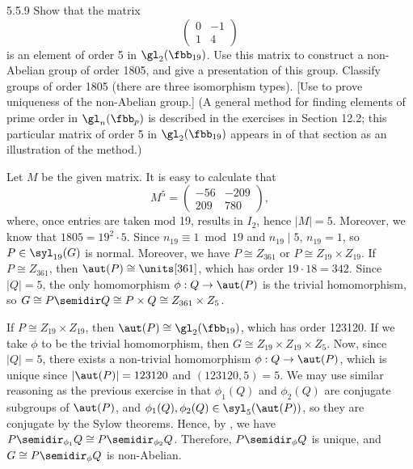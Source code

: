 \begin{exercise}{5.5.9}
    Show that the matrix
    \[
        \begin{pmatrix}
            0 & -1 \\
            1 & 4
        \end{pmatrix}
    \]
    is an element of order 5 in $\gl_2(\fbb_{19})$.
	Use this matrix to construct a non-Abelian group of order 1805, and give a presentation of this group.
	Classify groups of order 1805 (there are three isomorphism types). [Use  to prove uniqueness of the non-Abelian group.] (A general method for finding elements of prime order in $\gl_n(\fbb_p)$ is described in the exercises in Section 12.2; this particular matrix of order 5 in $\gl_2(\fbb_{19})$ appears in  of that section as an illustration of the method.)
\end{exercise}

\begin{sol}
    Let $M$ be the given matrix.
	It is easy to calculate that
    \[
    	M^5 = 
        \begin{pmatrix}
        -56 & -209 \\
        209 & 780
        \end{pmatrix},
	\]
    where, once entries are taken mod 19, results in $I_2$, hence $|M| = 5$.
	Moreover, we know that $1805 = 19^2 \cdot 5$.
	Since $n_{19} \equiv 1 \bmod 19$ and $n_{19} \mid 5$, $n_{19} = 1$, so $P \in \syl_{19}(G)$ is normal.
	Moreover, we have $P \cong Z_{361}$ or $P \cong Z_{19} \times Z_{19}$.
	If $P \cong Z_{361}$, then $\aut(P) \cong \units[361]$, which has order $19 \cdot 18 = 342$.
	Since $|Q| = 5$, the only homomorphism $\phi : Q \to \aut(P)$ is the trivial homomorphism, so $G \cong P \semidir Q \cong P \times Q \cong Z_{361} \times Z_5$.

    If $P \cong Z_{19} \times Z_{19}$, then $\aut(P) \cong \gl_2(\fbb_{19})$, which has order 123120.
	If we take $\phi$ to be the trivial homomorphism, then $G \cong Z_{19} \times Z_{19} \times Z_5$.
	Now, since $|Q| = 5$, there exists a non-trivial homomorphism $\phi : Q \to \aut(P)$, which is unique since $|\aut(P)| = 123120$ and $(123120, 5) = 5$.
	We may use similar reasoning as the previous exercise in that $\phi_1(Q)$ and $\phi_2(Q)$ are conjugate subgroups of $\aut(P)$, and $\phi_1(Q), \phi_2(Q) \in \syl_5(\aut(P))$, so they are conjugate by the Sylow theorems.
	Hence, by , we have $P \semidir_{\phi_1} Q \cong P \semidir_{\phi_2} Q$.
	Therefore, $P \semidir_\phi Q$ is unique, and $G \cong P \semidir_\phi Q$ is non-Abelian.
\end{sol}

